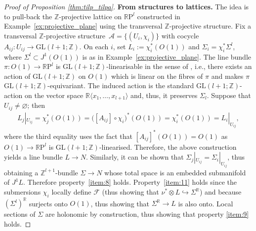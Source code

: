 \documentclass[pdftex]{sigma}
\numberwithin{equation}{section}
\newcommand{\RR}{\mathbb{R}}
\newcommand{\ZZ}{\mathbb{Z}}
\begin{document}
\begin{proof}[Proof of Proposition \ref{thm:tilp_tilpa}]
{\bf From structures to lattices.} The idea is to pull-back the $\ZZ$-projective lattice on $\RR\mathrm{P}^l$ constructed in Example~\ref{ex:projective_plane} using the transversal $\ZZ$-projective structure. Fix a transversal $\ZZ$-projective structure~$\mathcal{A} = \{(U_i,\chi_i)\}$ with cocycle $A_{ij} \colon U_{ij} \to \mathrm{GL}(l+1;\ZZ)$. On each $i$, set $L_i:= \chi^*_i(O(1))$ and $\Sigma_i = \chi^*_i \Sigma^l$, where $\Sigma^l \subset J^1(O(1))$ is as in Example~\ref{ex:projective_plane}. The line bundle $\pi \colon O(1) \to \RR\mathrm{P}^l$ is $\mathrm{GL}(l+1;\ZZ)$-linearisable in the sense of \cite{kklv}, i.e., there exists an action of $\mathrm{GL}(l+1;\ZZ)$ on $O(1)$ which is linear on the f\/ibres of $\pi$ and makes $\pi$ $\mathrm{GL}(l+1;\ZZ)$-equivariant. The induced action is the standard $\mathrm{GL}(l+1;\ZZ)$-action on the vector space $\RR \langle x_1,\ldots, x_{l+1} \rangle$ and, thus, it preserves $\Sigma_l$. Suppose that $U_{ij} \neq \varnothing$; then
 \begin{gather*}
 L_j|_{U_{ij}} = \chi^*_j (O(1)) = \big([A_{ij}] \circ \chi_i\big)^* (O(1)) = \chi_i^* (O(1)) = L_i|_{U_{ij}},
 \end{gather*}
where the third equality uses the fact that $[A_{ij}]^*(O(1)) = O(1)$ as $O(1) \to \RR\mathrm{P}^l$ is $\mathrm{GL}(l+1;\ZZ)$-linearised. Therefore, the above construction yields a line bundle $L \to N$. Similarly, it can be shown that $\Sigma_j|_{U_{ij}} = \Sigma_i|_{U_{ij}}$, thus obtaining a $\ZZ^{l+1}$-bundle $\Sigma \to N$ whose total space is an embedded submanifold of $J^1L$. Therefore property~\ref{item:8} holds. Property~\ref{item:11} holds since the submersions $\chi_i$ locally def\/ine $\mathcal{F}$ (thus showing that $\nu^* \otimes L \hookrightarrow \Sigma^{\RR}$) and because $\left(\Sigma^l\right)^{\RR}$ surjects onto $O(1)$, thus showing that $\Sigma^{\RR} \to L$ is also onto. Local sections of $\Sigma$ are holonomic by construction, thus showing that property \ref{item:9} holds.
\end{proof}
\end{document}
